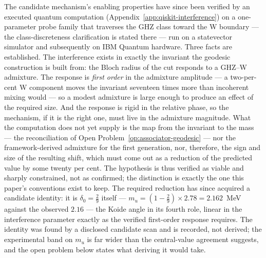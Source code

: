 The candidate mechanism's enabling properties have since been verified by an executed quantum
computation (Appendix~\ref{app:qiskit-interference}) on a one-parameter probe family that
traverses the GHZ class toward the W boundary --- the class-discreteness clarification is stated
there --- run on a statevector simulator and subsequently on IBM Quantum hardware. Three facts are established. The interference exists in
exactly the invariant the geodesic construction is built from: the Bloch radius of the cut responds
to a GHZ--W admixture. The response is \emph{first order} in the admixture amplitude --- a
two-per-cent W component moves the invariant seventeen times more than incoherent mixing would ---
so a modest admixture is large enough to produce an effect of the required size. And the response
is rigid in the relative phase, so the mechanism, if it is the right one, must live in the
admixture magnitude. What the computation does not yet supply is the map from the invariant to the
mass --- the reconciliation of Open Problem~\ref{op:associator-geodesic} --- nor the
framework-derived admixture for the first generation, nor, therefore, the sign and size of the
resulting shift, which must come out as a reduction of the predicted value by some twenty per
cent. The hypothesis is thus verified as viable and sharply constrained, not as confirmed; the
distinction is exactly the one this paper's conventions exist to keep. The required reduction has
since acquired a candidate identity: it is $\delta_0 = \tfrac29$ itself ---
$m_u = (1 - \tfrac29) \times 2.78 = 2.162$~MeV against the observed $2.16$ --- the Koide angle in
its fourth role, linear in the interference parameter exactly as the verified first-order response
requires. The identity was found by a disclosed candidate scan and is recorded, not derived; the
experimental band on $m_u$ is far wider than the central-value agreement suggests, and the
open problem below states what deriving it would take.

